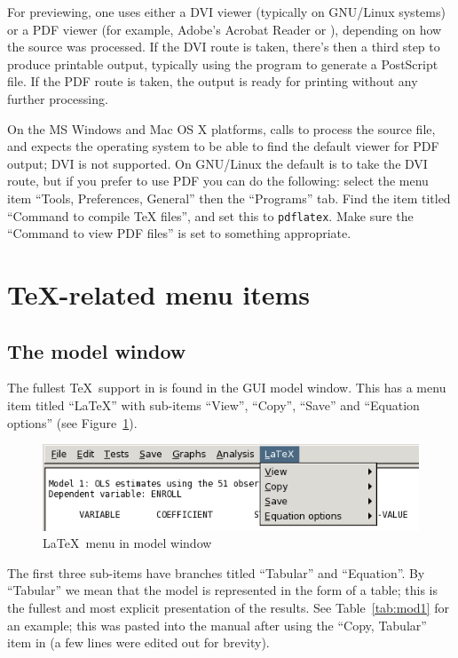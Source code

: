 For previewing, one uses either a DVI viewer (typically  on
GNU/Linux systems) or a PDF viewer (for example, Adobe's Acrobat
Reader or ), depending on how the source was processed.  If
the DVI route is taken, there's then a third step to produce printable
output, typically using the program  to generate a
PostScript file.  If the PDF route is taken, the output is ready for
printing without any further processing.

On the MS Windows and Mac OS X platforms,  calls
 to process the source file, and expects the operating
system to be able to find the default viewer for PDF output; DVI is
not supported.  On GNU/Linux the default is to take the DVI route, but
if you prefer to use PDF you can do the following: select the menu
item ``Tools, Preferences, General'' then the ``Programs'' tab.  Find
the item titled ``Command to compile TeX files'', and set this to
\texttt{pdflatex}.  Make sure the ``Command to view PDF files'' is set
to something appropriate.  

\section{\TeX-related menu items}
\label{tex-menus}

\subsection{The model window}

The fullest \TeX\ support in  is found in the GUI model
window.  This has a menu item titled ``LaTeX'' with sub-items
``View'', ``Copy'', ``Save'' and ``Equation options'' (see
Figure~\ref{fig:latex-menu}).  

\begin{figure}[htbp]
  \caption{\LaTeX\ menu in model window}
  \label{fig:latex-menu}
  \begin{center}
    \includegraphics[scale=0.75]{figures/latex_menu}
  \end{center}
\end{figure}

The first three sub-items have branches titled ``Tabular'' and
``Equation''.  By ``Tabular'' we mean that the model is represented in
the form of a table; this is the fullest and most explicit
presentation of the results.  See Table~\ref{tab:mod1} for an example;
this was pasted into the manual after using the ``Copy, Tabular'' item
in  (a few lines were edited out for brevity).


